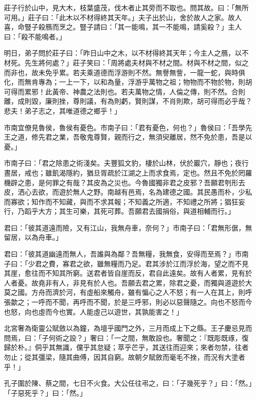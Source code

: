 
\begin{pinyinscope}
莊子行於山中，見大木，枝葉盛茂，伐木者止其旁而不取也。問其故。曰：「無所可用。」莊子曰：「此木以不材得終其天年。」夫子出於山，舍於故人之家。故人喜，命豎子殺鴈而烹之。豎子請曰：「其一能鳴，其一不能鳴，請奚殺？」主人曰：「殺不能鳴者。」

明日，弟子問於莊子曰：「昨日山中之木，以不材得終其天年；今主人之鴈，以不材死。先生將何處？」莊子笑曰：「周將處夫材與不材之間。材與不材之間，似之而非也，故未免乎累。若夫乘道德而浮游則不然。無譽無訾，一龍一蛇，與時俱化，而無肯專為；一上一下，以和為量，浮游乎萬物之祖；物物而不物於物，則胡可得而累邪！此黃帝、神農之法則也。若夫萬物之情，人倫之傳，則不然。合則離，成則毀，廉則挫，尊則議，有為則虧，賢則謀，不肖則欺，胡可得而必乎哉？悲夫！弟子志之，其唯道德之鄉乎！」

市南宜僚見魯侯，魯侯有憂色。市南子曰：「君有憂色，何也？」魯侯曰：「吾學先王之道，修先君之業，吾敬鬼尊賢，親而行之，無須臾離居，然不免於患，吾是以憂。」

市南子曰：「君之除患之術淺矣。夫豐狐文豹，棲於山林，伏於巖穴，靜也；夜行晝居，戒也；雖飢渴隱約，猶旦胥疏於江湖之上而求食焉，定也。然且不免於罔羅機辟之患，是何罪之有哉？其皮為之災也。今魯國獨非君之皮邪？吾願君刳形去皮，洒心去欲，而遊於無人之野。南越有邑焉，名為建德之國。其民愚而朴，少私而寡欲；知作而不知藏，與而不求其報；不知義之所適，不知禮之所將；猖狂妄行，乃蹈乎大方；其生可樂，其死可葬。吾願君去國捐俗，與道相輔而行。」

君曰：「彼其道遠而險，又有江山，我無舟車，奈何？」市南子曰：「君無形倨，無留居，以為舟車。」

君曰：「彼其道幽遠而無人，吾誰與為鄰？吾無糧，我無食，安得而至焉？」市南子曰：「少君之費，寡君之欲，雖無糧而乃足。君其涉於江而浮於海，望之而不見其崖，愈往而不知其所窮。送君者皆自崖而反，君自此遠矣。故有人者累，見有於人者憂。故堯非有人，非見有於人也。吾願去君之累，除君之憂，而獨與道遊於大莫之國。方舟而濟於河，有虛船來觸舟，雖有惼心之人不怒；有一人在其上，則呼張歙之；一呼而不聞，再呼而不聞，於是三呼邪，則必以惡聲隨之。向也不怒而今也怒，向也虛而今也實。人能虛己以遊世，其孰能害之！」

北宮奢為衛靈公賦斂以為鐘，為壇乎國門之外，三月而成上下之縣。王子慶忌見而問焉，曰：「子何術之設？」奢曰：「一之間，無敢設也。奢聞之：『既彫既琢，復歸於朴。』侗乎其無識，儻乎其怠疑；萃乎芒乎，其送往而迎來；來者勿禁，往者勿止；從其彊梁，隨其曲傅，因其自窮。故朝夕賦斂而毫毛不挫，而況有大塗者乎！」

孔子圍於陳、蔡之間，七日不火食。大公任往弔之，曰：「子幾死乎？」曰：「然。」「子惡死乎？」曰：「然。」


\end{pinyinscope}
